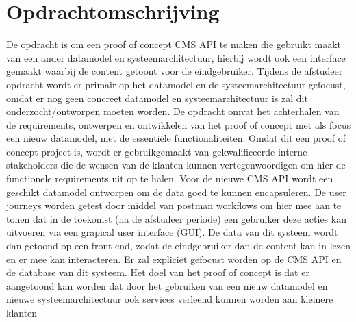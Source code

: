 \section{Opdrachtomschrijving}
De opdracht is om een proof of concept CMS API te maken die gebruikt maakt van een ander datamodel en systeemarchitectuur, hierbij wordt ook een interface gemaakt waarbij de content getoont voor de eindgebruiker.
Tijdens de afstudeer opdracht wordt er primair op het datamodel en de systeemarchitectuur gefocust, omdat er nog geen concreet datamodel en systeemarchitectuur is zal dit onderzocht/ontworpen moeten worden.
\whitespace
De opdracht omvat het achterhalen van de requirements, ontwerpen en ontwikkelen van het proof of
concept met als focus een nieuw datamodel, met de essentiële functionaliteiten. Omdat dit een proof of
concept project is, wordt er gebruikgemaakt van gekwalificeerde interne stakeholders die de wensen van
de klanten kunnen vertegenwoordigen om hier de functionele requirements uit op te halen.
\whitespace
Voor de nieuwe CMS API wordt een geschikt datamodel ontworpen om de data
goed te kunnen encapsuleren. De user journeys worden getest door middel van postman workflows om
hier mee aan te tonen dat in de toekomst (na de afstudeer periode) een gebruiker deze acties kan uitvoeren
via een grapical user interface (GUI).
\whitespace
De data van dit systeem wordt dan getoond op een front-end, zodat de eindgebruiker dan de content kan in
lezen en er mee kan interacteren. Er zal expliciet gefocust worden op de CMS API en de database van dit
systeem.
\whitespace
Het doel van het proof of concept is dat er aangetoond kan worden dat door het gebruiken van een nieuw
datamodel en nieuwe systeemarchitectuur ook services verleend kunnen worden aan kleinere klanten
